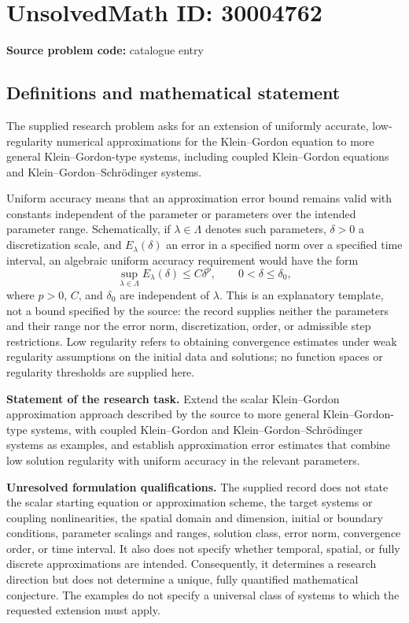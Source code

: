 \documentclass[11pt]{article}
\begin{document}
\section*{UnsolvedMath ID: 30004762}
\textbf{Source problem code:} catalogue entry
\subsection{Definitions and mathematical statement}
The supplied research problem asks for an extension of uniformly accurate, low-regularity numerical approximations for the Klein--Gordon equation to more general Klein--Gordon-type systems, including coupled Klein--Gordon equations and Klein--Gordon--Schr\"odinger systems.

Uniform accuracy means that an approximation error bound remains valid with constants independent of the parameter or parameters over the intended parameter range. Schematically, if \(\lambda\in\Lambda\) denotes such parameters, \(\delta>0\) a discretization scale, and \(E_\lambda(\delta)\) an error in a specified norm over a specified time interval, an algebraic uniform accuracy requirement would have the form
\[
\sup_{\lambda\in\Lambda} E_\lambda(\delta)\leq C\delta^p,
\qquad 0<\delta\leq\delta_0,
\]
where \(p>0\), \(C\), and \(\delta_0\) are independent of \(\lambda\). This is an explanatory template, not a bound specified by the source: the record supplies neither the parameters and their range nor the error norm, discretization, order, or admissible step restrictions. Low regularity refers to obtaining convergence estimates under weak regularity assumptions on the initial data and solutions; no function spaces or regularity thresholds are supplied here.

\textbf{Statement of the research task.} Extend the scalar Klein--Gordon approximation approach described by the source to more general Klein--Gordon-type systems, with coupled Klein--Gordon and Klein--Gordon--Schr\"odinger systems as examples, and establish approximation error estimates that combine low solution regularity with uniform accuracy in the relevant parameters.

\textbf{Unresolved formulation qualifications.} The supplied record does not state the scalar starting equation or approximation scheme, the target systems or coupling nonlinearities, the spatial domain and dimension, initial or boundary conditions, parameter scalings and ranges, solution class, error norm, convergence order, or time interval. It also does not specify whether temporal, spatial, or fully discrete approximations are intended. Consequently, it determines a research direction but does not determine a unique, fully quantified mathematical conjecture. The examples do not specify a universal class of systems to which the requested extension must apply.
\end{document}
